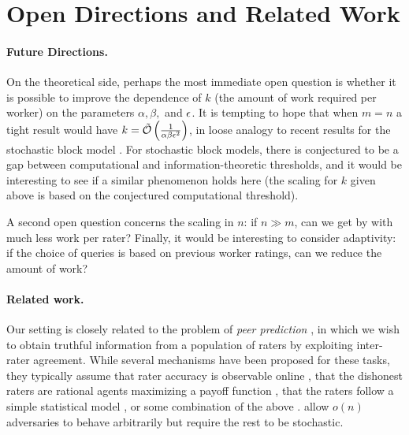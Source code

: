 \section{Open Directions and Related Work}
\label{sec:discussion}
\iffalse
\todo{fill in with lower bounds and conjectures that explain what 
``best possible'' result would look like, and how adversarial and 
stochastic settings compare}\fi

\paragraph{Future Directions.}
On the theoretical side, perhaps the most immediate open question is whether it is 
possible to improve the dependence of $k$ (the amount of work required per worker) 
on the parameters $\alpha, \beta,$ and $\epsilon$.  It is tempting to hope that 
when $m = n$ a tight result would have 
$k = \tilde{\mathcal{O}}\left( \tfrac{1}{\alpha\beta\epsilon^2} \right)$, in loose analogy
to recent results for the stochastic block model . 
For stochastic block models, there is conjectured to be a gap between 
computational and information-theoretic thresholds, and it would be 
interesting to see if a similar phenomenon holds here (the scaling for 
$k$ given above is based on the conjectured computational threshold).

A second open question concerns the scaling in $n$:
if $n \gg m$, can we get by with much less work per rater?
Finally, it would be interesting to consider adaptivity: if 
the choice of queries is based on previous worker ratings, 
can we reduce the amount of work?


\paragraph{Related work.}
Our setting is closely related to the problem of \emph{peer prediction} 
, in which we wish to obtain truthful information 
from a population of raters by exploiting inter-rater agreement. 
While several mechanisms have been proposed for these tasks, 
they typically assume that rater accuracy is observable online
, that the dishonest raters are 
rational agents maximizing a payoff function , that the raters follow a simple 
statistical model , or some combination of the above . 
 allow $o(n)$ adversaries 
to behave arbitrarily but require the rest to be stochastic.

